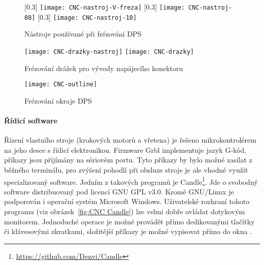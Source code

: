 \begin{figure}[htbp]
    \centering
    [0.3\textwidth]{%
        \texttt{[image: CNC-nastroj-V-freza]}%
    }
    [0.3\textwidth]{%
        \texttt{[image: CNC-nastroj-08]}%
    }
    [0.3\textwidth]{%
        \texttt{[image: CNC-nastroj-10]}%
    }
    \caption{Nástroje používané při frézování DPS}
    \label{fig:CNC nastroje}
\end{figure}

\begin{figure}[htbp]
    \centering
    \texttt{[image: CNC-drazky-nastroj]}
    \hfill
    \texttt{[image: CNC-drazky]}
    \caption{Frézování drážek pro vývody napájecího konektoru}
    \label{fig:CNC drazky}
\end{figure}

\begin{figure}[htbp]
    \centering
    \texttt{[image: CNC-outline]}
    \caption{Frézování okraje DPS}
    \label{fig:CNC outline}
\end{figure}


\paragraph{Řídicí software}
Řízení vlastního stroje (krokových motorů a vřetena) je řešeno mikrokontrolérem
na jeho desce s řídicí elektronikou. Firmware Grbl implementuje jazyk
G-kód, příkazy jsou přijímány na sériovém portu. Tyto příkazy by bylo možné
zasílat z běžného terminálu, pro zvýšení pohodlí při obsluze stroje je ale
vhodné využít specializovaný software. Jedním z takových programů je
Candle\footnote{\url{https://github.com/Denvi/Candle}}. Jde o svobodný software
distribuovaný pod licencí GNU GPL v3.0. Kromě GNU/Linux je podporován
i operační systém Microsoft Windows. Uživatelské rozhraní tohoto programu (viz
obrázek~\vref{fig:CNC Candle}) lze velmi dobře ovládat dotykovým monitorem.
Jednoduché operace je možné provádět přímo dedikovanými tlačítky či klávesovými
zkratkami, složitější příkazy je možné vypisovat přímo do okna .



